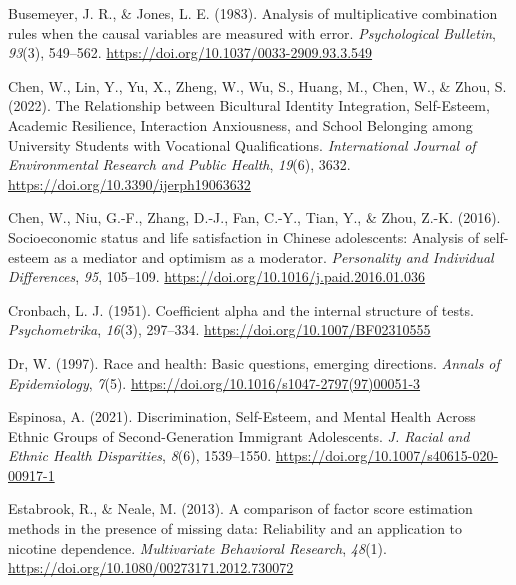 \documentclass[
  man]{apa7}
\newlength{\cslhangindent}
\newlength{\cslentryspacingunit} %
\newenvironment{CSLReferences}[2] %
 {%
  \setlength{\parindent}{0pt}
  \ifodd #1
  \let\oldpar\par
  \def\par{\hangindent=\cslhangindent\oldpar}
  \fi
  \setlength{\parskip}{#2\cslentryspacingunit}
 }%
 {}
\begin{document}
\begin{CSLReferences}{1}{0}
\leavevmode{}%
Busemeyer, J. R., \& Jones, L. E. (1983). Analysis of multiplicative combination rules when the causal variables are measured with error. \emph{Psychological Bulletin}, \emph{93}(3), 549--562. \url{https://doi.org/10.1037/0033-2909.93.3.549}

\leavevmode{}%
Chen, W., Lin, Y., Yu, X., Zheng, W., Wu, S., Huang, M., Chen, W., \& Zhou, S. (2022). The {Relationship} between {Bicultural Identity Integration}, {Self-Esteem}, {Academic Resilience}, {Interaction Anxiousness}, and {School Belonging} among {University Students} with {Vocational Qualifications}. \emph{International Journal of Environmental Research and Public Health}, \emph{19}(6), 3632. \url{https://doi.org/10.3390/ijerph19063632}

\leavevmode{}%
Chen, W., Niu, G.-F., Zhang, D.-J., Fan, C.-Y., Tian, Y., \& Zhou, Z.-K. (2016). Socioeconomic status and life satisfaction in {Chinese} adolescents: {Analysis} of self-esteem as a mediator and optimism as a moderator. \emph{Personality and Individual Differences}, \emph{95}, 105--109. \url{https://doi.org/10.1016/j.paid.2016.01.036}

\leavevmode{}%
Cronbach, L. J. (1951). Coefficient alpha and the internal structure of tests. \emph{Psychometrika}, \emph{16}(3), 297--334. \url{https://doi.org/10.1007/BF02310555}

\leavevmode{}%
Dr, W. (1997). Race and health: {Basic} questions, emerging directions. \emph{Annals of Epidemiology}, \emph{7}(5). \url{https://doi.org/10.1016/s1047-2797(97)00051-3}

\leavevmode{}%
Espinosa, A. (2021). Discrimination, {Self-Esteem}, and {Mental Health Across Ethnic Groups} of {Second-Generation Immigrant Adolescents}. \emph{J. Racial and Ethnic Health Disparities}, \emph{8}(6), 1539--1550. \url{https://doi.org/10.1007/s40615-020-00917-1}

\leavevmode{}%
Estabrook, R., \& Neale, M. (2013). A comparison of factor score estimation methods in the presence of missing data: {Reliability} and an application to nicotine dependence. \emph{Multivariate Behavioral Research}, \emph{48}(1). \url{https://doi.org/10.1080/00273171.2012.730072}


\end{CSLReferences}
\end{document}
